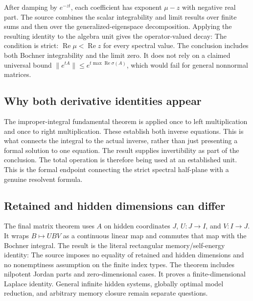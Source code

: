 After damping by $e^{-zt}$, each coefficient has exponent $\mu-z$ with negative real part. The source combines the scalar integrability and limit results over finite sums and then over the generalized-eigenspace decomposition. Applying the resulting identity to the algebra unit gives the operator-valued decay:
The condition is strict: $\operatorname{Re}\mu<\operatorname{Re}z$ for every spectral value. The conclusion includes both Bochner integrability and the limit zero. It does not rely on a claimed universal bound $\|e^{tA}\|\le e^{t\max\operatorname{Re}\sigma(A)}$, which would fail for general nonnormal matrices.

\subsection{Why both derivative identities appear}
The improper-integral fundamental theorem is applied once to left multiplication and once to right multiplication. These establish both inverse equations. This is what connects the integral to the actual inverse, rather than just presenting a formal solution to one equation.
The result supplies invertibility as part of the conclusion. The total operation  is therefore being used at an established unit. This is the formal endpoint connecting the strict spectral half-plane with a genuine resolvent formula.

\subsection{Retained and hidden dimensions can differ}
The final matrix theorem uses $A$ on hidden coordinates $J$, $U:J\to I$, and $V:I\to J$. It wraps $B\mapsto UBV$ as a continuous linear map and commutes that map with the Bochner integral. The result is the literal rectangular memory/self-energy identity:
The source imposes no equality of retained and hidden dimensions and no nonemptiness assumption on the finite index types. The theorem includes nilpotent Jordan parts and zero-dimensional cases. It proves a finite-dimensional Laplace identity. General infinite hidden systems, globally optimal model reduction, and arbitrary memory closure remain separate questions.
